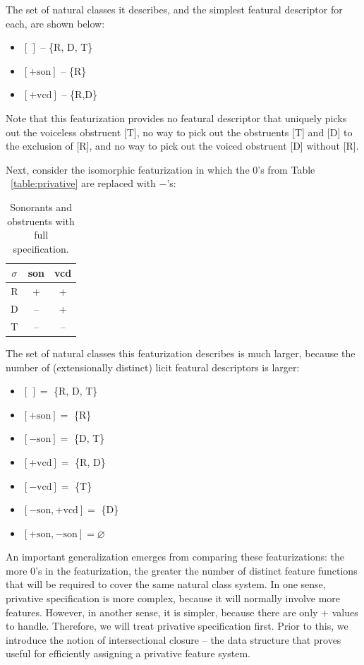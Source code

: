 \documentclass[11pt, oneside]{article}   	%
\begin{document}
\noindent The set of natural classes it describes, and the simplest featural descriptor for each, are shown below: \begin{itemize}
  \item $[\,]$ -- \{R, D, T\}
  \item $[+\text{son}]$ -- \{R\}
  \item $[+\text{vcd}]$ -- \{R,D\}
  \end{itemize}
  
\noindent Note that this featurization provides no featural descriptor that uniquely picks out the voiceless obstruent [T], no way to pick out the obstruents [T] and [D] to the exclusion of [R], and no way to pick out the voiced obstruent [D] without [R].

Next, consider the isomorphic featurization in which the $0$'s from Table ~\ref{table:privative} are replaced with $-$'s:

\begin{table}[h]
    \centering
    \begin{tabular} {|c||c|c|}
    \hline
        $\sigma$ & son & vcd \\ \hline
        R & + & + \\
        D & -- & + \\
        T & -- & -- \\
        \hline
    \end{tabular}
    \caption{Sonorants and obstruents with full specification.}
    \label{table:full}
\end{table}

\noindent The set of natural classes this featurization describes is much larger, because the number of (extensionally distinct) licit featural descriptors is larger: \begin{itemize}
    \item $[\,] =$ \{R, D, T\}
    \item $[+\text{son}] =$ \{R\}
    \item $[-\text{son}] =$ \{D, T\}
    \item $[+\text{vcd}] =$ \{R, D\}
    \item $[-\text{vcd}] =$ \{T\}
    \item $[-\text{son},+\text{vcd}] =$ \{D\}
    \item $[+\text{son},-\text{son}] = \varnothing$
    \end{itemize}

\noindent An important generalization emerges from comparing these featurizations: the more $0$'s in the featurization, the greater the number of distinct feature functions that will be required to cover the same natural class system. In one sense, privative specification is more complex, because it will normally involve more features. However, in another sense, it is simpler, because there are only $+$ values to handle. Therefore, we will treat privative specification first. Prior to this, we introduce the notion of intersectional closure -- the data structure that proves useful for efficiently assigning a privative feature system.
\end{document}
